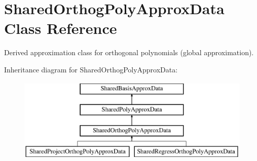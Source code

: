 \section{Shared\+Orthog\+Poly\+Approx\+Data Class Reference}
\label{classPecos_1_1SharedOrthogPolyApproxData}


Derived approximation class for orthogonal polynomials (global approximation).  


Inheritance diagram for Shared\+Orthog\+Poly\+Approx\+Data\+:\begin{figure}[H]
\begin{center}
\leavevmode
\includegraphics[height=4.000000cm]{classPecos_1_1SharedOrthogPolyApproxData}
\end{center}
\end{figure}
